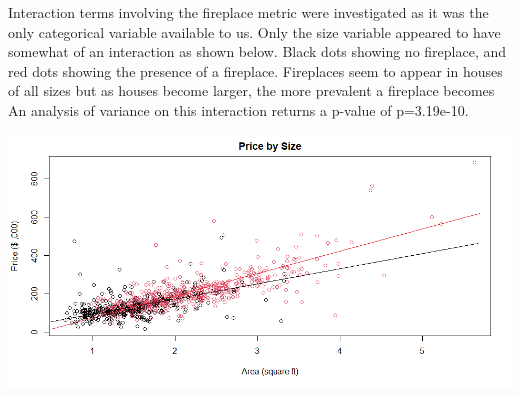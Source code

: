 \documentclass[10pt,A4,makeidx]{article}
\begin{document}
  Interaction terms involving the fireplace metric were investigated as it was the only 
  categorical variable available to us. Only the size variable appeared to
  have somewhat of an interaction as shown below. Black dots showing no fireplace, and
  red dots showing the presence of a fireplace. Fireplaces seem to appear in houses 
  of all sizes but as houses become larger, the more prevalent a fireplace becomes An
  analysis of variance on this interaction returns a p-value of p=3.19e-10.\\
  \begin{center}
    \includegraphics[width=15cm]{int-fireplacesize.png}
  \end{center}
\end{document}
